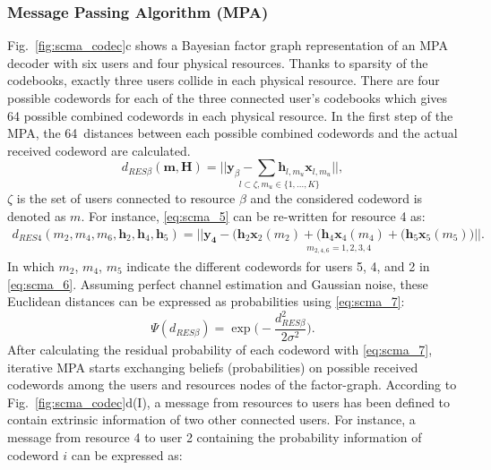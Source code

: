 \subsubsection{Message Passing Algorithm (MPA)}
\label{sec:scma_mpa}

Fig.~\ref{fig:scma_codec}c shows a Bayesian factor graph representation of an
MPA decoder with six users and four physical resources. Thanks to sparsity of
the codebooks, exactly three users collide in each physical resource. There are
four possible codewords for each of the three connected user's codebooks which
gives 64 possible combined codewords in each physical resource. In the first
step of the MPA, the 64~distances between each possible combined codewords and
the actual received codeword are calculated.
\begin{equation}
  \label{eq:scma_5}
  d_{RES  \beta}(\bm{m}, \bm{H}) =
  \underset{l \subset \zeta, m_u\in\{1,...,K\}}{||\bm{y}_\beta -
  \sum \bm{h}_{l,m_u} \bm{x}_{l,m_u} ||},
\end{equation}
$\zeta$ is the set of users connected to resource $\beta$ and the
considered codeword is denoted as $m$. For instance, \eqref{eq:scma_5} can be
re-written for resource 4 as:
\begin{equation}
  \label{eq:scma_6}
  \begin{split}
  d_{RES 4}(m_2,m_4,m_6,\bm{h}_2, \bm{h}_4, \bm{h}_5) =
  \underset{m_{2,4,6}=1,2,3,4}{|| \bm{y_4} - \Big(\bm{h}_2\bm{x}_2(m_2) +
  (\bm{h}_4\bm{x}_4(m_4) + (\bm{h}_5\bm{x}_5(m_5) \Big) ||}.
  \end{split}
\end{equation}
In which $m_2$, $m_4$, $m_5$ indicate the different codewords for users 5, 4,
and 2 in \eqref{eq:scma_6}. Assuming perfect channel estimation and Gaussian
noise, these Euclidean distances can be expressed as probabilities using
\eqref{eq:scma_7}:
\begin{equation}
  \label{eq:scma_7}
  \Psi(d_{RES \beta}) = \exp \Bigg(-\frac{d_{RES \beta}^2}{2\sigma^2} \Bigg).
\end{equation}
After calculating the residual probability of each codeword with
\eqref{eq:scma_7}, iterative MPA starts exchanging beliefs (probabilities) on
possible received codewords among the users and resources nodes of the
factor-graph. According to Fig.~\ref{fig:scma_codec}d(I), a message from
resources to users has been defined to contain extrinsic information of two
other connected users. For instance, a message from resource 4 to user 2
containing the probability information of codeword $i$ can be expressed as:
